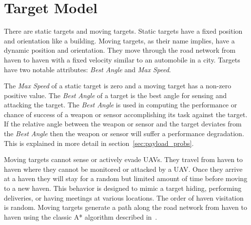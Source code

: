 \chapter{Target Model}
There are static targets and moving targets.  Static targets have a fixed position and orientation like a building.  Moving targets, as their name implies, have a dynamic position and orientation.  They move through the road network from haven to haven with a fixed velocity similar to an automobile in a city.  Targets have two notable attributes: \textit{Best Angle} and \textit{Max Speed}.

The \textit{Max Speed} of a static target is zero and a moving target has a non-zero positive value.  The \textit{Best Angle} of a target is the best angle for sensing and attacking the target.  The \textit{Best Angle} is used in computing the performance or chance of success of a weapon or sensor accomplishing its task against the target.  If the relative angle between the weapon or sensor and the target deviates from the \textit{Best Angle} then the weapon or sensor will suffer a performance degradation.  This is explained in more detail in section~\ref{sec:payload_probs}.



Moving targets cannot sense or actively evade UAVs.  They travel from haven to haven where they cannot be monitored or attacked by a UAV.  Once they arrive at a haven they will stay for a random but limited amount of time before moving to a new haven.  This behavior is designed to mimic a target hiding, performing deliveries, or having meetings at various locations.  The order of haven visitation is random.  Moving targets generate a path along the road network from haven to haven using the classic A* algorithm described in~\cite{wiki:astar}.

